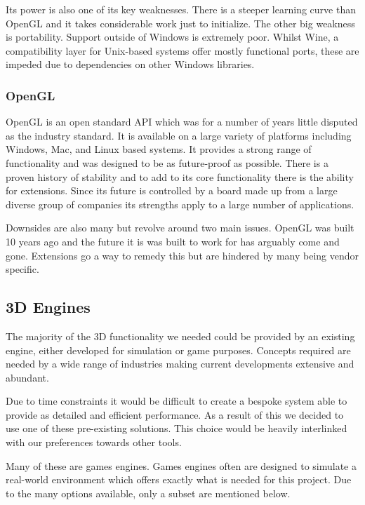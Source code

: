Its power is also one of its key weaknesses. There is a steeper learning
curve than OpenGL and it takes considerable work just to initialize.
The other big weakness is portability. Support outside of Windows is extremely poor. 
Whilst Wine, a compatibility layer for Unix-based
systems offer mostly functional ports, these are impeded due to dependencies
on other Windows libraries.


\subsubsection{OpenGL}

OpenGL is an open standard API which was for a number of years little
disputed as the industry standard. It is available on a large variety
of platforms including Windows, Mac, and Linux based systems. It provides
a strong range of functionality and was designed to be as future-proof
as possible. There is a proven history of stability and to add to
its core functionality there is the ability for extensions. Since
its future is controlled by a board made up from a large diverse group
of companies its strengths apply to a large number of applications.

Downsides are also many but revolve around two main issues. OpenGL
was built 10 years ago and the future it is was built to work for has
arguably come and gone. Extensions go a way to remedy this but are
hindered by many being vendor specific.


\subsection{3D Engines}

The majority of the 3D functionality we needed could be provided by
an existing engine, either developed for simulation or game purposes.
Concepts required are needed by a wide range of industries making
current developments extensive and abundant.

Due to time constraints it would be difficult to create
a bespoke system able to provide as detailed and efficient performance.
As a result of this we decided to use one of these pre-existing solutions.
This choice would be heavily interlinked with our preferences towards
other tools.

Many of these are games engines. Games engines often are
designed to simulate a real-world environment which offers exactly
what is needed for this project. Due to the many options available,
only a subset are mentioned below.


